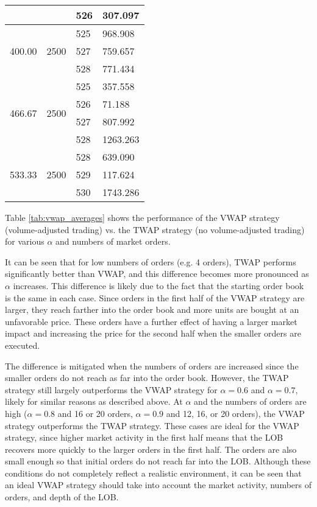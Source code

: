 \begin{table}[htbp]
\begin{center}
\begin{tabular}{l|l|l|l}
                        &                       & 526 & 307.097  \\
\hline
\multirow{3}{*}{400.00} & \multirow{3}{*}{2500} & 525 & 968.908  \\
                        &                       & 527 & 759.657  \\
                        &                       & 528 & 771.434  \\
\hline
\multirow{4}{*}{466.67} & \multirow{4}{*}{2500} & 525 & 357.558  \\
                        &                       & 526 & 71.188   \\
                        &                       & 527 & 807.992  \\
                        &                       & 528 & 1263.263 \\
\hline
\multirow{3}{*}{533.33} & \multirow{3}{*}{2500} & 528 & 639.090  \\
                        &                       & 529 & 117.624  \\
                        &                       & 530 & 1743.286
\end{tabular}
\end{center}
\end{table}

Table \ref{tab:vwap_averages} shows the performance of the VWAP strategy (volume-adjusted trading) vs. the TWAP strategy (no volume-adjusted trading) for various $\alpha$ and numbers of market orders. 

It can be seen that for low numbers of orders (e.g. 4 orders), TWAP performs significantly better than VWAP, and this difference becomes more pronounced as $\alpha$ increases. This difference is likely due to the fact that the starting order book is the same in each case. Since orders in the first half of the VWAP strategy are larger, they reach farther into the order book and more units are bought at an unfavorable price. These orders have a further effect of having a larger market impact and increasing the price for the second half when the smaller orders are executed. 

The difference is mitigated when the numbers of orders are increased since the smaller orders do not reach as far into the order book. However, the TWAP strategy still largely outperforms the VWAP strategy for $\alpha = 0.6$ and $\alpha = 0.7$, likely for similar reasons as described above. At $\alpha$ and the numbers of orders are high ($\alpha = 0.8$ and 16 or 20 orders, $\alpha = 0.9$ and 12, 16, or 20 orders), the VWAP strategy outperforms the TWAP strategy. These cases are ideal for the VWAP strategy, since higher market activity in the first half means that the LOB recovers more quickly to the larger orders in the first half. The orders are also small enough so that initial orders do not reach far into the LOB. Although these conditions do not completely reflect a realistic environment, it can be seen that an ideal VWAP strategy should take into account the market activity, numbers of orders, and depth of the LOB.

